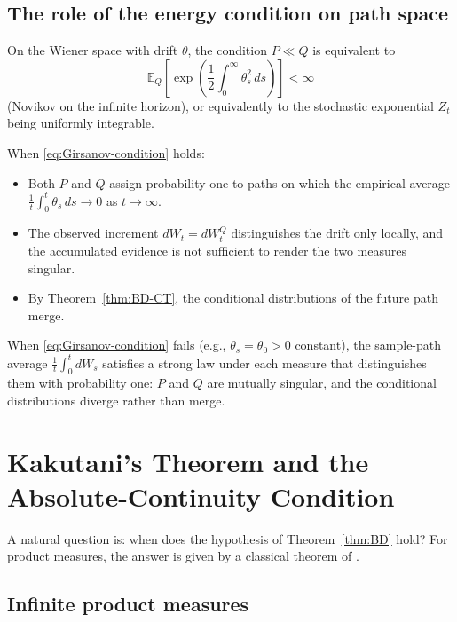 \documentclass[12pt]{article}
\newcommand{\E}{\mathbb{E}}
\begin{document}
\subsection{The role of the energy condition on path space}

On the Wiener space with drift $\theta$, the condition $P \ll Q$ is
equivalent to
\begin{equation}
\label{eq:Girsanov-condition}
\E_Q\!\left[\exp\!\left(\frac{1}{2}\int_0^\infty \theta_s^2\, ds\right)\right]
< \infty
\end{equation}
(Novikov on the infinite horizon), or equivalently to the stochastic
exponential $Z_t$ being uniformly integrable.

When \eqref{eq:Girsanov-condition} holds:
\begin{itemize}
\item Both $P$ and $Q$ assign probability one to paths on which the empirical
      average $\frac{1}{t}\int_0^t \theta_s\, ds \to 0$ as $t \to \infty$.
\item The observed increment $dW_t = dW_t^Q$ distinguishes the drift only
      locally, and the accumulated evidence is not sufficient to render the
      two measures singular.
\item By Theorem~\ref{thm:BD-CT}, the conditional distributions of the
      future path merge.
\end{itemize}
When \eqref{eq:Girsanov-condition} fails (e.g., $\theta_s = \theta_0 > 0$
constant), the sample-path average $\frac{1}{t}\int_0^t dW_s$ satisfies a
strong law under each measure that distinguishes them with probability one:
$P$ and $Q$ are mutually singular, and the conditional distributions
diverge rather than merge.

\section{Kakutani's Theorem and the Absolute-Continuity Condition}
\label{sec:kakutani}

A natural question is: when does the hypothesis of Theorem~\ref{thm:BD}
hold?  For product measures, the answer is given by a classical theorem of
\citet{kakutani1948}.

\subsection{Infinite product measures}
\end{document}
